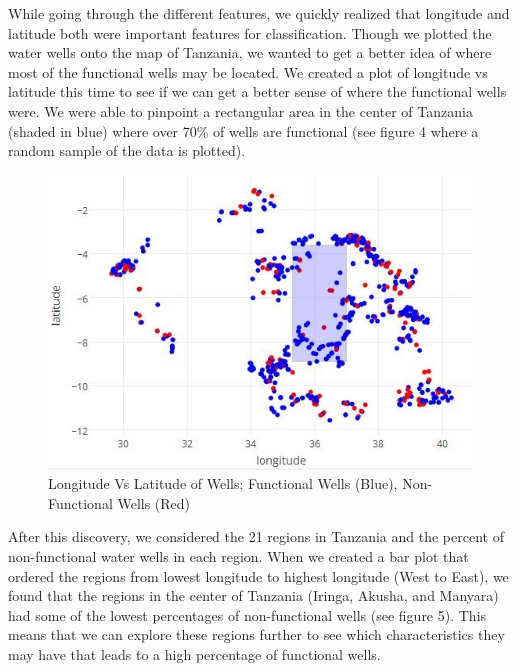 \documentclass[10pt]{SelfArx} %
\begin{document}
While going through the different features, we quickly realized that longitude and latitude both were important features for classification. Though we plotted the water wells onto the map of Tanzania, we wanted to get a better idea of where most of the functional wells may be located. We created a plot of longitude vs latitude this time to see if we can get a better sense of where the functional wells were. We were able to pinpoint a rectangular area  in the center of Tanzania (shaded in blue) where over 70\% of wells are functional (see figure 4 where a random sample of the data is plotted).
\\[-1.5\baselineskip]
\break

\setlength{\belowcaptionskip}{0pt}
\begin{figure}[ht]\centering
\includegraphics[width=\linewidth]{map_color2.jpg}
\caption{Longitude Vs Latitude of Wells; Functional Wells (Blue), Non-Functional Wells (Red)}
\label{fig:map2}
\end{figure}

After this discovery, we considered the 21 regions in Tanzania and the percent of non-functional water wells in each region. When we created a bar plot that ordered the regions from lowest longitude to highest longitude (West to East), we found that the regions in the center of Tanzania (Iringa, Akusha, and Manyara) had some of the lowest percentages of non-functional wells (see figure 5). This means that we can explore these regions further to see which characteristics they may have that leads to a high percentage of functional wells. 
\end{document}
